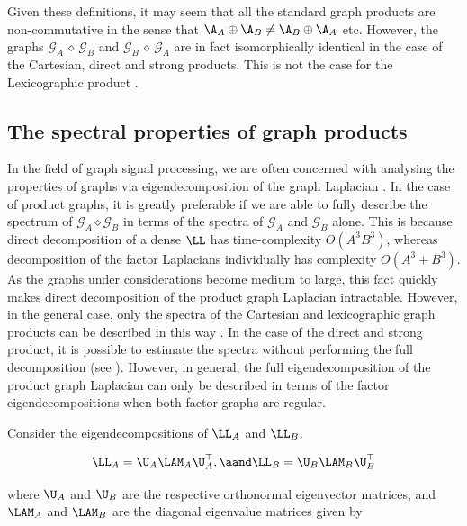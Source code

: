 


Given these definitions, it may seem that all the standard graph products are non-commutative in the sense that $\A_A \oplus \A_B  \neq \A_B \oplus \A_A $ etc. However, the graphs $\mathcal{G}_A \, \diamond \, \mathcal{G}_B$ and $\mathcal{G}_B \, \diamond \, \mathcal{G}_A$ are in fact isomorphically identical in the case of the Cartesian, direct and strong products. This is not the case for the Lexicographic product \citep{Imrich2000}. 

\subsection{The spectral properties of graph products}

In the field of graph signal processing, we are often concerned with analysing the properties of graphs via eigendecomposition of the graph Laplacian \citep{Mieghem2010}. In the case of product graphs, it is greatly preferable if we are able to fully describe the spectrum of $\mathcal{G}_A \diamond \mathcal{G}_B$ in terms of the spectra of $\mathcal{G}_A$ and $\mathcal{G}_B$ alone. This is because direct decomposition of a dense $\LL$ has time-complexity $O(A^3B^3)$, whereas decomposition of the factor Laplacians individually has complexity $O(A^3 + B^3)$. As the graphs under considerations become medium to large, this fact quickly makes direct decomposition of the product graph Laplacian intractable. However, in the general case, only the spectra of the Cartesian and lexicographic graph products can be described in this way \citep{Barik2018}. In the case of the direct and strong product, it is possible to estimate the spectra without performing the full decomposition (see \citep{Sayama2016}). However, in general, the full eigendecomposition of the product graph Laplacian can only be described in terms of the factor eigendecompositions when both factor graphs are regular. 


Consider the eigendecompositions of $\LL_A$ and $\LL_B$. 

\begin{equation}
    \LL_A = \U_A \LAM_A \U_A^\top, \aand \LL_B = \U_B \LAM_B \U_B^\top
\end{equation}

where $\U_A$ and $\U_B$ are the respective orthonormal eigenvector matrices, and $\LAM_A$ and $\LAM_B$ are the diagonal eigenvalue matrices given by 


